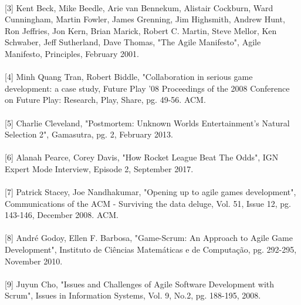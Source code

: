 \documentclass{article}
\begin{document}
\paragraph{}
[3] Kent Beck, Mike Beedle, Arie van Bennekum, Alistair Cockburn, Ward Cunningham, Martin Fowler, James Grenning, Jim Highsmith, Andrew Hunt, Ron Jeffries, Jon Kern, Brian Marick, Robert C. Martin, Steve Mellor, Ken Schwaber, Jeff Sutherland, Dave Thomas, "The Agile Manifesto", Agile Manifesto, Principles, February 2001.
\paragraph{}
[4] Minh Quang Tran, Robert Biddle, "Collaboration in serious game development: a case study, Future Play '08 Proceedings of the 2008 Conference on Future Play: Research, Play, Share, pg. 49-56. ACM.
\paragraph{}
[5] Charlie Cleveland, "Postmortem: Unknown Worlds Entertainment's Natural Selection 2", Gamasutra, pg. 2, February 2013.
\paragraph{}
[6] Alanah Pearce, Corey Davis, "How Rocket League Beat The Odds", IGN Expert Mode Interview, Episode 2, September 2017.
\paragraph{}
[7] Patrick Stacey, Joe Nandhakumar, "Opening up to agile games development", Communications of the ACM - Surviving the data deluge, Vol. 51, Issue 12, pg. 143-146, December 2008. ACM.
\paragraph{}
[8] Andr\'{e} Godoy, Ellen F. Barbosa, "Game-Scrum: An Approach to Agile Game Development", Instituto de Ci\^{e}ncias Matem\'{a}ticas e de Computa\c{c}\~{a}o, pg. 292-295, November 2010.
\paragraph{}
[9] Juyun Cho, "Issues and Challenges of Agile Software Development with Scrum", Issues in Information Systems, Vol. 9, No.2, pg. 188-195, 2008.
\end{document}
